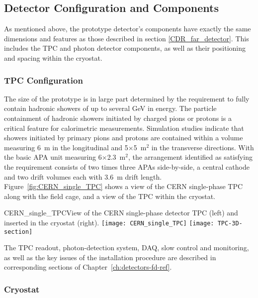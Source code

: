\subsection{Detector Configuration and Components}

As mentioned above, the prototype detector's components have exactly the same dimensions
and features as those described in section \ref{CDR_far_detector}. This includes the TPC and photon detector components,
as well as their positioning and spacing within the cryostat.%

\subsubsection{TPC Configuration}

The size of the %
prototype %
is in large part determined by the requirement to fully contain hadronic showers of up to several GeV in energy.
The particle containment of hadronic showers initiated by charged pions or protons
is a critical feature for calorimetric measurements. Simulation studies indicate that showers initiated by 
primary pions and protons are contained within a volume measuring 6~m in the longitudinal and 5$\times$5~m$^2$
in the transverse directions. With the basic APA unit measuring 6$\times$2.3~m$^2$, the arrangement 
identified as satisfying the requirement consists of two times
three APAs side-by-side, a central cathode and two drift volumes each with 3.6~m  drift length. Figure~\ref{fig:CERN_single_TPC} shows a view of the CERN single-phase TPC along with the field cage, and  a view of the TPC within the cryostat.
%
\begin{cdrfigure}{CERN_single_TPC}{View of the CERN single-phase detector TPC (left) and inserted in the cryostat (right). }
\texttt{[image: CERN\_single\_TPC]}
\texttt{[image: TPC-3D-section]}
\end{cdrfigure}
%
The TPC readout, photon-detection system, DAQ, slow control and monitoring, as well as
the key issues of the installation procedure %
are described in corresponding sections of Chapter~\ref{ch:detectors-fd-ref}.

\subsubsection{Cryostat}


